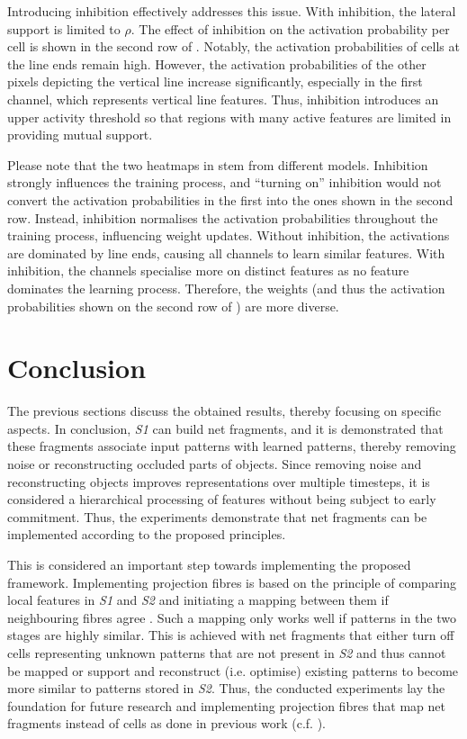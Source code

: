Introducing inhibition effectively addresses this issue.
With inhibition, the lateral support is limited to $\rho$.
The effect of inhibition on the activation probability per cell is shown in the second row of .
Notably, the activation probabilities of cells at the line ends remain high. However, the activation probabilities of the other pixels depicting the vertical line increase significantly, especially in the first channel, which represents vertical line features.
Thus, inhibition introduces an upper activity threshold so that regions with many active features are limited in providing mutual support.

Please note that the two heatmaps in  stem from different models.
Inhibition strongly influences the training process, and ``turning on'' inhibition would not convert the activation probabilities in the first into the ones shown in the second row.
Instead, inhibition normalises the activation probabilities throughout the training process, influencing weight updates.
Without inhibition, the activations are dominated by line ends, causing all channels to learn similar features.
With inhibition, the channels specialise more on distinct features as no feature dominates the learning process. Therefore, the weights (and thus the activation probabilities shown on the second row of ) are more diverse.

\section{Conclusion}
The previous sections discuss the obtained results, thereby focusing on specific aspects.
In conclusion, \emph{S1} can build net fragments, and it is demonstrated that these fragments associate input patterns with learned patterns, thereby removing noise or reconstructing occluded parts of objects.
Since removing noise and reconstructing objects improves representations over multiple timesteps, it is considered a hierarchical processing of features without being subject to early commitment.
Thus, the experiments demonstrate that net fragments can be implemented according to the proposed principles.

This is considered an important step towards implementing the proposed framework.
Implementing projection fibres is based on the principle of comparing local features in \emph{S1} and \emph{S2} and initiating a mapping between them if neighbouring fibres agree .
Such a mapping only works well if patterns in the two stages are highly similar.
This is achieved with net fragments that either turn off cells representing unknown patterns that are not present in \emph{S2} and thus cannot be mapped or support and reconstruct (i.e. optimise) existing patterns to become more similar to patterns stored in \emph{S2}.
Thus, the conducted experiments lay the foundation for future research and implementing projection fibres that map net fragments instead of cells as done in previous work (c.f. ).